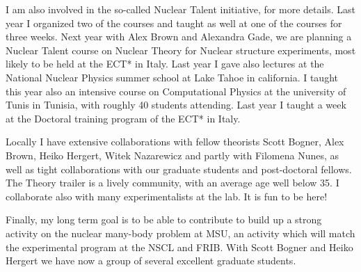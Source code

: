 \documentclass[prc,amsart,english,twocolumn,superscriptaddress,showpacs,floatfix]{revtex4}
\begin{document}
I am also involved in the so-called Nuclear Talent initiative,  for more details. Last year I organized two of the courses and taught as well at one of the courses for three weeks. Next year with Alex Brown and Alexandra Gade, we are planning a Nuclear Talent course on Nuclear Theory for Nuclear structure experiments, most likely to be held at the ECT* in Italy. Last year I gave also lectures at the National Nuclear Physics summer school at Lake Tahoe in california. I taught this year also an intensive course on Computational Physics at the university of Tunis in Tunisia, with roughly 40 students attending. Last year I taught a week at the Doctoral training program of the ECT* in Italy. 

Locally I have extensive collaborations with fellow theorists Scott Bogner, Alex Brown, Heiko Hergert, Witek Nazarewicz and partly with Filomena Nunes, as well as tight collaborations with our graduate students and post-doctoral fellows. The Theory trailer is a lively community, with an average age well below 35. I collaborate also 
with many experimentalists at the lab. It is fun to be here!

Finally, my long term goal is to be able to contribute to build up a
strong activity on the nuclear many-body problem at MSU, an activity
which will match the experimental program at the NSCL and FRIB. With
Scott Bogner and Heiko Hergert we have now a group of several excellent graduate students. 


 
\end{document}
